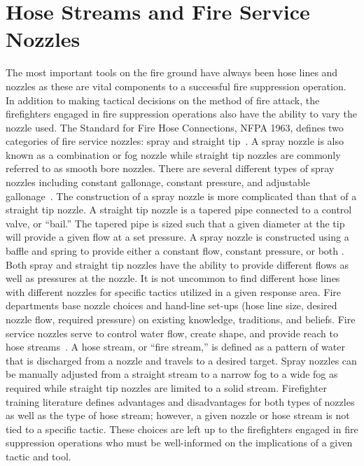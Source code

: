 \documentclass[12pt,oneside]{book}
\begin{document}
\section*{Hose Streams and Fire Service Nozzles}
The most important tools on the fire ground have always been hose lines and nozzles as these are vital components to a successful fire suppression operation. In addition to making tactical decisions on the method of fire attack, the firefighters engaged in fire suppression operations also have the ability to vary the nozzle used. The Standard for Fire Hose Connections, NFPA 1963, defines two categories of fire service nozzles: spray and straight tip~\cite{NFPA1963}. A spray nozzle is also known as a combination or fog nozzle while straight tip nozzles are commonly referred to as smooth bore nozzles. There are several different types of spray nozzles including constant gallonage, constant pressure, and adjustable gallonage~\cite{FEHandbook}. The construction of a spray nozzle is more complicated than that of a straight tip nozzle. A straight tip nozzle is a tapered pipe connected to a control valve, or ``bail.'' The tapered pipe is sized such that a given diameter at the tip will provide a given flow at a set pressure. A spray nozzle is constructed using a baffle and spring to provide either a constant flow, constant pressure, or both \cite{TFT_NozzleGuide}. Both spray and straight tip nozzles have the ability to provide different flows as well as pressures at the nozzle. It is not uncommon to find different hose lines with different nozzles for specific tactics utilized in a given response area. Fire departments base nozzle choices and hand-line set-ups (hose line size, desired nozzle flow, required pressure) on existing knowledge, traditions, and beliefs. Fire service nozzles serve to control water flow, create shape, and provide reach to hose streams~\cite{Essentials6}. A hose stream, or ``fire stream,'' is defined as a pattern of water that is discharged from a nozzle and travels to a desired target. Spray nozzles can be manually adjusted from a straight stream to a narrow fog to a wide fog as required while straight tip nozzles are limited to a solid stream. Firefighter training literature defines advantages and disadvantages for both types of nozzles as well as the type of hose stream; however, a given nozzle or hose stream is not tied to a specific tactic. These choices are left up to the firefighters engaged in fire suppression operations who must be well-informed on the implications of a given tactic and tool.
\end{document}
